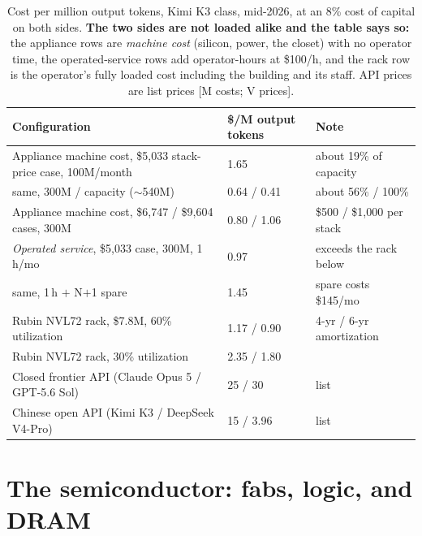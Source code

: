 \begin{table}[htbp]
\centering\footnotesize
\caption{Cost per million output tokens, Kimi K3 class, mid-2026, at an 8\% cost of capital on both sides. \textbf{The two sides are not loaded alike and the table says so:} the appliance rows are \emph{machine cost} (silicon, power, the closet) with no operator time, the operated-service rows add operator-hours at \$100/h, and the rack row is the operator's fully loaded cost including the building and its staff. API prices are list prices [M costs; V prices].}
\label{tab:headtohead}
\begin{tabular}{@{}lll@{}}
\toprule
\textbf{Configuration} & \textbf{\$/M output tokens} & \textbf{Note} \\
\midrule
Appliance machine cost, \$5,033 stack-price case, 100M/month & 1.65 & about 19\% of capacity \\
\quad same, 300M / capacity ($\sim$540M) & 0.64 / 0.41 & about 56\% / 100\% \\
Appliance machine cost, \$6,747 / \$9,604 cases, 300M & 0.80 / 1.06 & \$500 / \$1,000 per stack \\
\emph{Operated service}, \$5,033 case, 300M, 1\,h/mo & 0.97 & exceeds the rack below \\
\quad same, 1\,h $+$ N$+$1 spare & 1.45 & spare costs \$145/mo \\
Rubin NVL72 rack, \$7.8M, 60\% utilization & 1.17 / 0.90 & 4-yr / 6-yr amortization \\
Rubin NVL72 rack, 30\% utilization & 2.35 / 1.80 & \\
Closed frontier API (Claude Opus 5 / GPT-5.6 Sol) & 25 / 30 & list \\
Chinese open API (Kimi K3 / DeepSeek V4-Pro) & 15 / 3.96 & list \\
\bottomrule
\end{tabular}
\end{table}

\section{The semiconductor: fabs, logic, and DRAM}
\label{c:semi}

